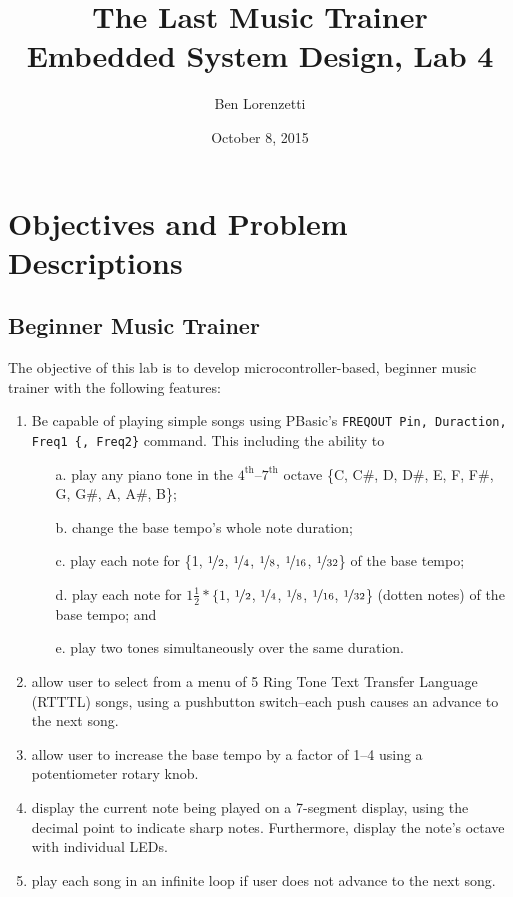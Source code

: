 \documentclass[11pt]{article}
\begin{document}
\title{The Last Music Trainer\\Embedded System Design, Lab 4}
\date{October 8, 2015}
\author{Ben Lorenzetti}
\maketitle

\tableofcontents

\clearpage

\section{Objectives and Problem Descriptions}
\subsection{Beginner Music Trainer}
\label{problem-specs}

The objective of this lab is to develop microcontroller-based, beginner music trainer 
with the following features:
\begin{enumerate}

\item Be capable of playing simple songs using PBasic's 
\mbox{\texttt{FREQOUT Pin, Duraction, Freq1 \{, Freq2\}}} command.
This including the ability to
\begin{enumerate}
\item[a.] play any piano tone in the $4^{\textrm{th}}$--$7^{\textrm{th}}$ octave
\{C, C\#, D, D\#, E, F, F\#, G, G\#, A, A\#, B\};

\item[b.] change the base tempo's whole note duration;

\item[c.] play each note for \{1, $\nicefrac{1}{2}$, $\nicefrac{1}{4}$, $\nicefrac{1}{8}$,
$\nicefrac{1}{16}$, $\nicefrac{1}{32}$\} of the base tempo;

\item[d.] play each note for $1\frac{1}{2}*\{1$, $\nicefrac{1}{2}$, $\nicefrac{1}{4}$, $\nicefrac{1}{8}$, 
$\nicefrac{1}{16}$, $\nicefrac{1}{32}$\} (dotten notes) of the base tempo; and

\item[e.] play two tones simultaneously over the same duration.
\end{enumerate}

\item allow user to select from a menu of 5 Ring Tone Text Transfer Language
(RTTTL) songs,
using a pushbutton switch--each push causes an advance to the next song.

\item allow user to increase the base tempo by a factor of 1--4 using a potentiometer rotary knob.

\item display the current note being played on a 7-segment display,
using the decimal point to indicate sharp notes.
Furthermore, display the note's octave with individual LEDs.

\item play each song in an infinite loop if user does not advance to the next song.
\end{enumerate}
\end{document}
